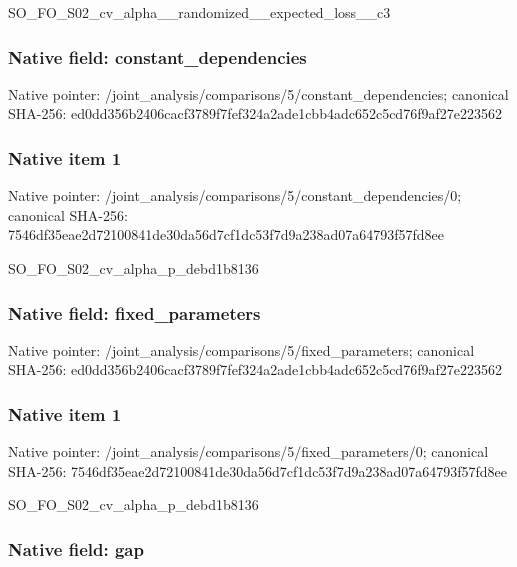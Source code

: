 \documentclass[10pt,a4paper]{article}
\begin{document}
SO\_FO\_S02\_cv\_alpha\_\_rand\allowbreak{}omized\_\_expected\_loss\_\_c\allowbreak{}3


\subsubsection{Native field: constant\_dependencies}


Native pointer: /joint\_analysis/comparis\allowbreak{}ons/5/constant\_dependenc\allowbreak{}ies; canonical SHA-256: ed0dd356b2406cacf3789f7f\allowbreak{}ef324a2ade1cbb4adc652c5c\allowbreak{}d76f9af27e223562



\subsubsection{Native item 1}


Native pointer: /joint\_analysis/comparis\allowbreak{}ons/5/constant\_dependenc\allowbreak{}ies/0; canonical SHA-256: 7546df35eae2d72100841de3\allowbreak{}0da56d7cf1dc53f7d9a238ad\allowbreak{}07a64793f57fd8ee


SO\_FO\_S02\_cv\_alpha\_p\_debd1b8136


\subsubsection{Native field: fixed\_parameters}


Native pointer: /joint\_analysis/comparis\allowbreak{}ons/5/fixed\_parameters; canonical SHA-256: ed0dd356b2406cacf3789f7f\allowbreak{}ef324a2ade1cbb4adc652c5c\allowbreak{}d76f9af27e223562



\subsubsection{Native item 1}


Native pointer: /joint\_analysis/comparis\allowbreak{}ons/5/fixed\_parameters/0; canonical SHA-256: 7546df35eae2d72100841de3\allowbreak{}0da56d7cf1dc53f7d9a238ad\allowbreak{}07a64793f57fd8ee


SO\_FO\_S02\_cv\_alpha\_p\_debd1b8136


\subsubsection{Native field: gap}
\end{document}
